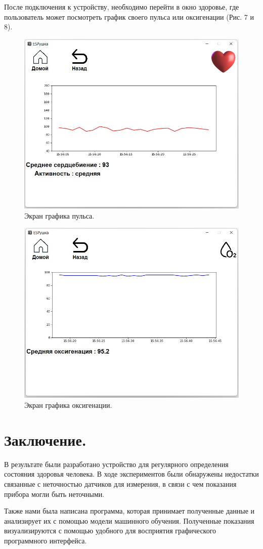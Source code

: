 \documentclass[a4document]{article}
\begin{document}
{\newpage\noindent
После подключения к устройству, необходимо перейти в окно здоровье, где пользователь может посмотреть график своего пульса или оксигенации (Рис. 7 и 8).

\begin{figure}[htp]
    \centering
    \includegraphics[width=0.5\linewidth]{Pics/BPM.jpg}
    \caption{Экран графика пульса.}
    \label{fig:pk2}
\end{figure}

\begin{figure}[htp]
    \centering
    \includegraphics[width=0.5\linewidth]{Pics/SPo2.jpg}
    \caption{Экран графика оксигенации.}
    \label{fig:pk2}
\end{figure}

\newpage
\hfill \break
}

{


\newpage

\section*{Заключение.} 

В результате были разработано устройство для регулярного определения состояния здоровья человека. 
В ходе экспериментов были обнаружены недостатки связанные с неточностью датчиков
для измерения, в связи с чем показания прибора могли быть неточными.
\par\noindent
Также нами была написана программа, которая принимает полученные данные и анализирует
их с помощью модели машинного обучения. Полученные показания визуализируются с помощью удобного 
для восприятия графического программного интерфейса.
}
\end{document}
